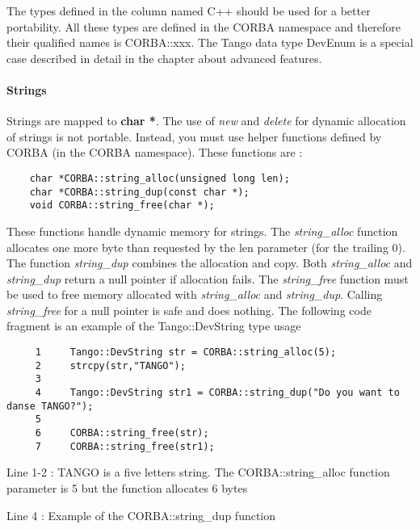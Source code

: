 \vspace{0.3cm}


The types defined in the column named C++ should be used for a better
portability. All these types are defined in the CORBA namespace and
therefore their qualified names is CORBA::xxx. The Tango data type
DevEnum is a special case described in detail in the
chapter about advanced features.


\paragraph{Strings}

Strings are mapped to \textbf{char {*}}. The use of \emph{new} and
\emph{delete} for dynamic allocation of strings is not portable. Instead,
you must use helper functions defined by CORBA (in the CORBA namespace).
These functions are :


\begin{verbatim}
    char *CORBA::string_alloc(unsigned long len);
    char *CORBA::string_dup(const char *);
    void CORBA::string_free(char *);
\end{verbatim}


These functions handle dynamic memory for strings. The \emph{string\_alloc}
function allocates one more byte than requested by the len parameter
(for the trailing 0). The function \emph{string\_dup}
combines the allocation and copy. Both \emph{string\_alloc} and \emph{string\_dup}
return a null pointer if allocation fails. The \emph{string\_free}
function must be used to free memory allocated with \emph{string\_alloc}
and \emph{string\_dup}. Calling \emph{string\_free} for a null pointer
is safe and does nothing. The following code fragment is an example
of the Tango::DevString type usage


\begin{verbatim}
     1     Tango::DevString str = CORBA::string_alloc(5);
     2     strcpy(str,"TANGO");
     3  
     4     Tango::DevString str1 = CORBA::string_dup("Do you want to danse TANGO?");
     5  
     6     CORBA::string_free(str);
     7     CORBA::string_free(str1);
\end{verbatim}


Line 1-2 : TANGO is a five letters string. The CORBA::string\_alloc
function parameter is 5 but the function allocates 6 bytes

Line 4 : Example of the CORBA::string\_dup function

